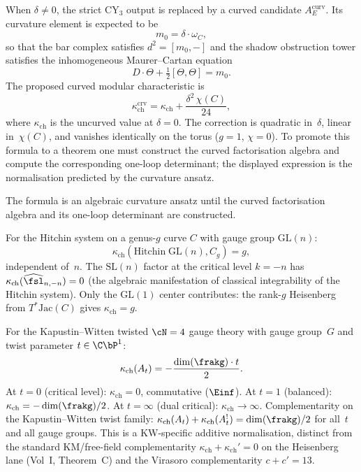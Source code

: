 \begin{conjecture}
\label{thm:curved-chiral-non-cy}
\ClaimStatusConjectured
When $\delta \neq 0$, the strict CY$_3$ output is replaced by a curved candidate $A_E^{\mathrm{curv}}$. Its curvature element is expected to be
\[
 m_0=\delta\cdot\omega_C,
\]
so that the bar complex satisfies $d^2=[m_0,-]$ and the shadow obstruction tower satisfies the inhomogeneous Maurer--Cartan equation
\[
 D \cdot \Theta + \tfrac{1}{2}[\Theta, \Theta] = m_0.
\]
The proposed curved modular characteristic is
\begin{equation}
\label{eq:kappa-curved}
 \kappa_{\mathrm{ch}}^{\mathrm{crv}} = \kappa_{\mathrm{ch}} + \frac{\delta^2 \, \chi(C)}{24},
\end{equation}
where $\kappa_{\mathrm{ch}}$ is the uncurved value at $\delta = 0$. The correction is quadratic in~$\delta$, linear in~$\chi(C)$, and vanishes identically on the torus ($g = 1$, $\chi = 0$). To promote this formula to a theorem one must construct the curved factorisation algebra and compute the corresponding one-loop determinant; the displayed expression is the normalisation predicted by the curvature ansatz.

The formula is an algebraic curvature ansatz until the curved
factorisation algebra and its one-loop determinant are constructed.
\end{conjecture}

\begin{theorem}
\label{thm:hitchin-kappa}
For the Hitchin system on a genus-$g$ curve $C$ with gauge group $\mathrm{GL}(n)$:
\[
 \kappa_{\mathrm{ch}}(\mathrm{Hitchin}\;\mathrm{GL}(n), C_g) = g,
\]
independent of~$n$. The $\mathrm{SL}(n)$ factor at the critical level $k = -n$ has $\kappa_{\mathrm{ch}}(\widehat{\fsl}_{n, -n}) = 0$ (the algebraic manifestation of classical integrability of the Hitchin system). Only the $\mathrm{GL}(1)$ center contributes: the rank-$g$ Heisenberg from $T^*\mathrm{Jac}(C)$ gives $\kappa_{\mathrm{ch}} = g$.
\end{theorem}

\begin{proposition}
\label{prop:kw-kappa-linear}
For the Kapustin--Witten twisted $\cN = 4$ gauge theory with gauge group~$G$ and twist parameter $t \in \C\bP^1$:
\[
 \kappa_{\mathrm{ch}}(A_t) = -\frac{\dim(\frakg) \cdot t}{2}.
\]
At $t = 0$ (critical level): $\kappa_{\mathrm{ch}} = 0$, commutative ($\Einf$). At $t = 1$ (balanced): $\kappa_{\mathrm{ch}} = -\dim(\frakg)/2$. At $t = \infty$ (dual critical): $\kappa_{\mathrm{ch}} \to \infty$. Complementarity on the Kapustin--Witten twist family: $\kappa_{\mathrm{ch}}(A_t) + \kappa_{\mathrm{ch}}(A_t^!) = \dim(\frakg)/2$ for all~$t$ and all gauge groups. This is a KW-specific additive normalisation, distinct from the standard KM/free-field complementarity $\kappa_{\mathrm{ch}} + \kappa_{\mathrm{ch}}'=0$ on the Heisenberg lane (Vol~I, Theorem~C) and the Virasoro complementarity $c+c'=13$.
\end{proposition}

